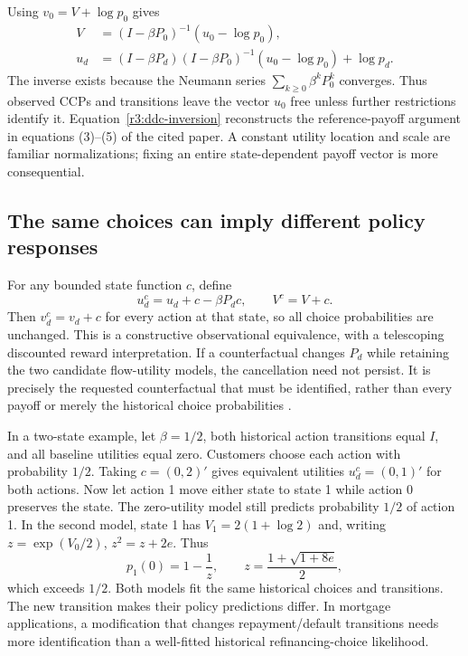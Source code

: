 Using $v_0=V+\log p_0$ gives
\begin{align}
 V&=(I-\beta P_0)^{-1}(u_0-\log p_0),\nonumber\\
 u_d&=(I-\beta P_d)(I-\beta P_0)^{-1}(u_0-\log p_0)+\log p_d.
 \label{r3:ddc-inversion}
\end{align}
The inverse exists because the Neumann series
$\sum_{k\ge0}\beta^kP_0^k$ converges. Thus observed CCPs and
transitions leave the vector $u_0$ free unless further restrictions
identify it. Equation~\eqref{r3:ddc-inversion} reconstructs the
reference-payoff argument in equations (3)--(5) of the cited paper.
A constant utility location and scale are familiar normalizations;
fixing an entire state-dependent payoff vector is more consequential.

\subsection{The same choices can imply different policy responses}
For any bounded state function $c$, define
\begin{equation}
 u_d^c=u_d+c-\beta P_dc,\qquad V^c=V+c.
 \label{r3:utility-equivalence}
\end{equation}
Then $v_d^c=v_d+c$ for every action at that state, so all choice
probabilities are unchanged. This is a constructive observational
equivalence, with a telescoping discounted reward interpretation.
If a counterfactual changes $P_d$ while retaining the two candidate
flow-utility models, the cancellation need not persist. It is precisely
the requested counterfactual that must be identified, rather than every
payoff or merely the historical choice probabilities
\citep{kalouptsidi2021}.

In a two-state example, let $\beta=1/2$, both historical action
transitions equal $I$, and all baseline utilities equal zero. Customers
choose each action with probability $1/2$. Taking $c=(0,2)'$ gives
equivalent utilities $u_d^c=(0,1)'$ for both actions. Now let action
1 move either state to state 1 while action 0 preserves the state.
The zero-utility model still predicts probability $1/2$ of action 1.
In the second model, state 1 has
$V_1=2(1+\log2)$ and, writing $z=\exp(V_0/2)$,
$z^2=z+2e$. Thus
\[
 p_1(0)=1-\frac{1}{z},\qquad
 z=\frac{1+\sqrt{1+8e}}2,
\]
which exceeds $1/2$. Both models fit the same historical choices and
transitions. The new transition makes their policy predictions differ.
In mortgage applications, a modification that changes repayment/default
transitions needs more identification than a well-fitted historical
refinancing-choice likelihood.

